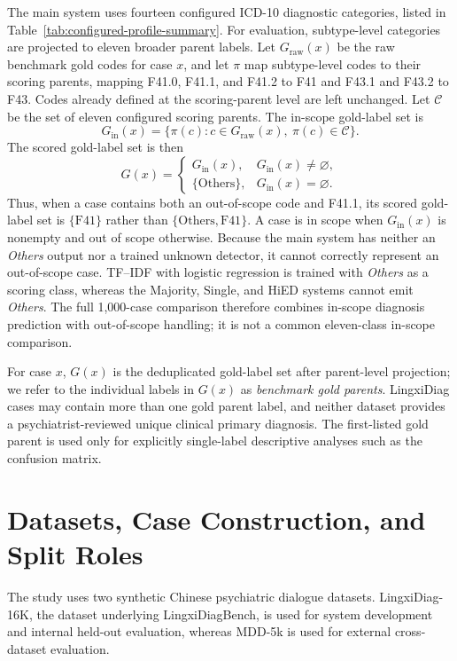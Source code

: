 \documentclass[12pt,a4paper,oneside]{report}
\begin{document}
The main system uses fourteen configured ICD-10 diagnostic categories, listed in Table~\ref{tab:configured-profile-summary}. For evaluation, subtype-level categories are projected to eleven broader parent labels. Let $G_{\mathrm{raw}}(x)$ be the raw benchmark gold codes for case $x$, and let $\pi$ map subtype-level codes to their scoring parents, mapping F41.0, F41.1, and F41.2 to F41 and F43.1 and F43.2 to F43. Codes already defined at the scoring-parent level are left unchanged. Let $\mathcal{C}$ be the set of eleven configured scoring parents. The in-scope gold-label set is
\[
G_{\mathrm{in}}(x)=\{\pi(c):c\in G_{\mathrm{raw}}(x),\ \pi(c)\in\mathcal{C}\}.
\]
The scored gold-label set is then
\[
G(x)=
\begin{cases}
G_{\mathrm{in}}(x), & G_{\mathrm{in}}(x)\neq\varnothing,\\
\{\mathrm{Others}\}, & G_{\mathrm{in}}(x)=\varnothing.
\end{cases}
\]
Thus, when a case contains both an out-of-scope code and F41.1, its scored gold-label set is $\{\mathrm{F41}\}$ rather than $\{\mathrm{Others},\mathrm{F41}\}$. A case is in scope when $G_{\mathrm{in}}(x)$ is nonempty and out of scope otherwise. Because the main system has neither an \emph{Others} output nor a trained unknown detector, it cannot correctly represent an out-of-scope case. TF--IDF with logistic regression is trained with \emph{Others} as a scoring class, whereas the Majority, Single, and HiED systems cannot emit \emph{Others}. The full 1,000-case comparison therefore combines in-scope diagnosis prediction with out-of-scope handling; it is not a common eleven-class in-scope comparison.

For case $x$, $G(x)$ is the deduplicated gold-label set after parent-level projection; we refer to the individual labels in $G(x)$ as \emph{benchmark gold parents}. LingxiDiag cases may contain more than one gold parent label, and neither dataset provides a psychiatrist-reviewed unique clinical primary diagnosis. The first-listed gold parent is used only for explicitly single-label descriptive analyses such as the confusion matrix.

\section{Datasets, Case Construction, and Split Roles}

The study uses two synthetic Chinese psychiatric dialogue datasets. LingxiDiag-16K, the dataset underlying LingxiDiagBench, is used for system development and internal held-out evaluation, whereas MDD-5k is used for external cross-dataset evaluation.
\end{document}
